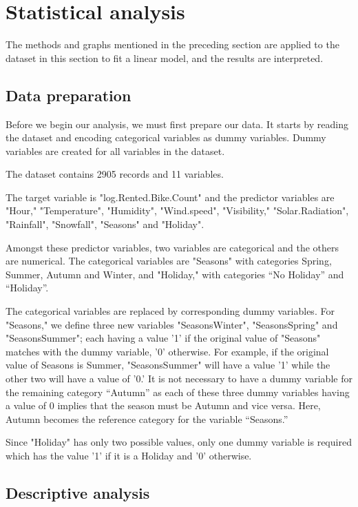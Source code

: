 \documentclass[12 pt]{scrartcl}
\begin{document}
\section{Statistical analysis}

The methods and graphs mentioned in the preceding section are applied to the dataset in this section to fit a linear model, and the results are interpreted.

\subsection{Data preparation}

Before we begin our analysis, we must first prepare our data. It starts by reading the dataset and encoding categorical variables as dummy variables. Dummy variables are created for all variables in the dataset. 

The dataset contains 2905 records and 11 variables. 

The target variable is "log.Rented.Bike.Count" and the predictor variables are "Hour," "Temperature", "Humidity", "Wind.speed", "Visibility," "Solar.Radiation", "Rainfall", "Snowfall", "Seasons" and "Holiday".

Amongst these predictor variables, two variables are categorical and the others are numerical. The categorical variables are "Seasons" with categories Spring, Summer, Autumn and Winter, and "Holiday," with categories “No Holiday” and “Holiday”.

The categorical variables are replaced by corresponding dummy variables. For "Seasons," we define three new variables "SeasonsWinter", "SeasonsSpring" and "SeasonsSummer"; each having a value '1' if the original value of "Seasons" matches with the dummy variable, '0' otherwise. For example, if the original value of Seasons is Summer, "SeasonsSummer" will have a value '1' while the other two will have a value of '0.' It is not necessary to have a dummy variable for the remaining category “Autumn” as each of these three dummy variables having a value of 0 implies that the season must be Autumn and vice versa. Here, Autumn becomes the reference category for the variable “Seasons.”

Since "Holiday" has only two possible values, only one dummy variable is required which has the value '1' if it is a Holiday and '0' otherwise.


\subsection{Descriptive analysis}
\end{document}
